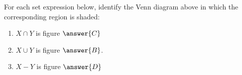 \documentclass[nooutcomes]{ximera}
\begin{document}
\begin{problem}
%
%

For each set expression below, identify the Venn diagram above in which the corresponding region is shaded: 
\begin{enumerate}
\item $X\cap Y$ is figure $\answer{C}$
\item $X\cup Y$ is figure $\answer{B}$. 
\item $X - Y$ is figure $\answer{D}$
\end{enumerate}

\end{problem}
\end{document}
